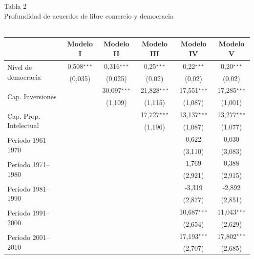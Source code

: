 \documentclass[a4paper]{tufte-handout}
\begin{document}
\begin{table}[h]
  \centering
  \selectfont
   \smallskip\noindent\small Tabla 2 \\ Profundidad de acuerdos de libre comercio y democracia \\~\\
  \begin{tabular}{l c c c c c}
    \toprule
     & Modelo I & Modelo II & Modelo III & Modelo IV & Modelo V \\ \midrule
    \multirow{2}{*}{Nivel de democracia} & 0,508$^{\star\star\star}$ & 0,316$^{\star\star\star}$  & 0,25$^{\star\star\star}$  & 0,22$^{\star\star\star}$  & 0,20$^{\star\star\star}$ \\
    & {\scriptsize (0,035)} & {\scriptsize (0,025)} & {\scriptsize (0,02)} & {\scriptsize (0,02)} & {\scriptsize (0,02)} \\ 
    \multirow{2}{*}{Cap. Inversiones} & & 30,097$^{\star\star\star}$ & 21,828$^{\star\star\star}$ & 17,551$^{\star\star\star}$ & 17,285$^{\star\star\star}$ \\
    & & {\scriptsize (1,109)} & {\scriptsize (1,115)} & {\scriptsize (1,087)} & {\scriptsize (1,001)} \\
    \multirow{2}{*}{Cap. Prop. Intelectual} & & & 17,727$^{\star\star\star}$ & 13,137$^{\star\star\star}$ & 13,277$^{\star\star\star}$ \\
    & & & {\scriptsize (1,196)} & {\scriptsize (1,087)} & {\scriptsize (1.077)} \\
    \multirow{2}{*}{Período 1961--1970} & & & & 0,622  & 0,030 \\
    & & & & {\scriptsize (3,110)} & {\scriptsize (3,083)} \\
    \multirow{2}{*}{Período 1971--1980} & & & & 1,769 & 0,388 \\
    & & & & {\scriptsize (2,921)} & {\scriptsize (2,915)} \\
    \multirow{2}{*}{Período  1981--1990} & & & & -3,319 & -2,892 \\
    & & & & {\scriptsize (2,877)} & {\scriptsize (2,851)} \\
    \multirow{2}{*}{Período 1991--2000} & & & & 10,687$^{\star\star\star}$ & 11,043$^{\star\star\star}$ \\
    & & & & {\scriptsize (2,654)} & {\scriptsize (2,629)} \\ 
    \multirow{2}{*}{Período  2001--2010} & & & & 17,193$^{\star\star\star}$ & 17,802$^{\star\star\star}$ \\
    & & & & {\scriptsize (2,707)} & {\scriptsize (2,685)}\\ 

\end{tabular}
\end{table}
\end{document}

